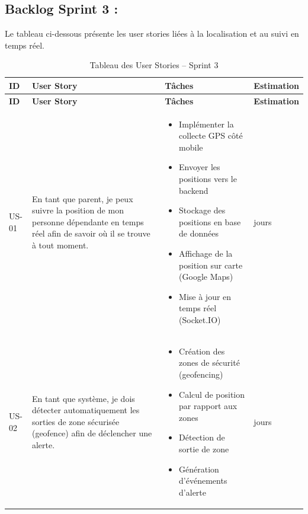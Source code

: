 \subsection{Backlog Sprint 3 :}

Le tableau ci-dessous présente les user stories liées à la localisation et au suivi en temps réel.
\small
\setlength{\tabcolsep}{3pt}
\renewcommand{\arraystretch}{1.0}
\setlength{\parskip}{0pt}
\begin{longtable}{|>{\centering\arraybackslash}p{}|>{\raggedright\arraybackslash}p{}|>{\raggedright\arraybackslash}p{}|>{\centering\arraybackslash}p{}|}
\caption{Tableau des User Stories – Sprint 3} \\
\hline
\textbf{ID} & \textbf{User Story} & \textbf{Tâches} & \textbf{Estimation} \\ \hline
\endfirsthead

\hline
\textbf{ID} & \textbf{User Story} & \textbf{Tâches} & \textbf{Estimation} \\ \hline
\endhead

\hline
\endlastfoot

US-01 & En tant que parent, je peux suivre la position de mon personne dépendante en temps réel afin de savoir où il se trouve à tout moment.
& \begin{itemize}[leftmargin=*, nosep]
\item Implémenter la collecte GPS côté mobile
\item Envoyer les positions vers le backend
\item Stockage des positions en base de données
\item Affichage de la position sur carte (Google Maps)
\item Mise à jour en temps réel (Socket.IO)
\end{itemize}
& 4 jours \\ \hline

US-02 & En tant que système, je dois détecter automatiquement les sorties de zone sécurisée (geofence) afin de déclencher une alerte.
& \begin{itemize}[leftmargin=*, nosep]
\item Création des zones de sécurité (geofencing)
\item Calcul de position par rapport aux zones
\item Détection de sortie de zone
\item Génération d’événements d’alerte
\end{itemize}
& 3 jours \\ \hline


\end{longtable}
